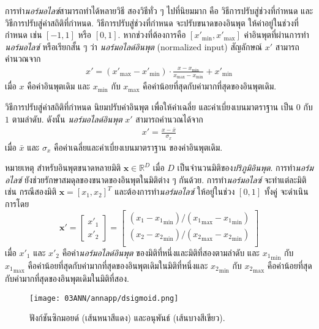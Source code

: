 การทำ\textit{นอร์มอไลซ์}สามารถทำได้หลายวิธี 
สองวิธีทั่ว ๆ ไปที่นิยมมาก คือ วิธีการปรับสู่ช่วงที่กำหนด และวิธีการปรับสู่ค่าสถิติที่กำหนด.
วิธีการปรับสู่ช่วงที่กำหนด จะปรับขนาดของอินพุต
ให้ค่าอยู่ในช่วงที่กำหนด เช่น $[-1,1]$ หรือ $[0,1]$.
หากช่วงที่ต้องการคือ
$[x'_{\min}, x'_{\max}]$ 
ค่าอินพุตที่ผ่านการทำ\textit{นอร์มอไลซ์}
หรือเรียกสั้น ๆ ว่า \textit{นอร์มอไลด์อินพุต} (normalized input) สัญลักษณ์ $x'$ สามารถคำนวณจาก
\begin{align}
x' = (x'_{\max} - x'_{\min}) \cdot \frac{x - x_{\min}}{x_{\max} - x_{\min}} + x'_{\min}
\label{eq: ann normalization [0,1]}
\end{align}
เมื่อ $x$ คือค่าอินพุตเดิม 
และ
$x_{\min}$ กับ $x_{\max}$ คือค่าน้อยที่สุดกับค่ามากที่สุดของอินพุตเดิม.

วิธีการปรับสู่ค่าสถิติที่กำหนด
นิยมปรับค่าอินพุต
เพื่อให้ค่าเฉลี่ย
และค่าเบี่ยงเบนมาตราฐาน เป็น $0$ กับ $1$ ตามลำดับ.
ดังนั้น
\textit{นอร์มอไลด์อินพุต} $x'$ สามารถคำนวณได้จาก
\begin{align}
x' = \frac{x - \bar{x}}{\sigma_x}
\label{eq: ann normalization stat}
\end{align}
เมื่อ $\bar{x}$ และ $\sigma_x$ คือค่าเฉลี่ยและค่าเบี่ยงเบนมาตราฐาน ของค่าอินพุตเดิม.

หมายเหตุ
สำหรับอินพุตขนาดหลายมิติ $\bm{x} \in \mathbb{R}^D$ เมื่อ $D$ เป็นจำนวนมิติของ\textit{ปริภูมิอินพุต}.
การทำ\textit{นอร์มอไลซ์} 
ยังช่วยรักษาสมดุลของขนาดของอินพุตในมิติต่าง ๆ กันด้วย.
การทำ\textit{นอร์มอไลซ์}
จะทำแต่ละมิติ 
เช่น กรณีสองมิติ $\bm{x} = [x_1, x_2]^T$ และต้องการทำ\textit{นอร์มอไลซ์}
ให้อยู่ในช่วง $[0,1]$ ทั้งคู่
จะดำเนินการโดย 
\[
\bm{x}' = \begin{bmatrix}
x'_1 \\
x'_2
\end{bmatrix}
= \begin{bmatrix}
(x_1 - {x_1}_{\min})/({x_1}_{\max} - {x_1}_{\min}) \\
(x_2 - {x_2}_{\min})/({x_2}_{\max} - {x_2}_{\min}) \\
\end{bmatrix}
\]
เมื่อ 
$x'_1$ และ $x'_2$ คือค่า\textit{นอร์มอไลด์อินพุต}
ของมิติที่หนึ่งและมิติที่สองตามลำดับ
และ
${x_1}_{\min}$ กับ ${x_1}_{\max}$ คือค่าน้อยที่สุดกับค่ามากที่สุดของอินพุตเดิมในมิติที่หนึ่งและ ${x_2}_{\min}$ กับ ${x_2}_{\max}$ คือค่าน้อยที่สุดกับค่ามากที่สุดของอินพุตเดิมในมิติที่สอง.




%
\begin{figure}
	\begin{center}
		\texttt{[image: 03ANN/annapp/dsigmoid.png]}
	\end{center}
	\caption[ฟังก์ชันซิกมอยด์]{ฟังก์ชันซิกมอยด์ (เส้นหนาสีแดง) และอนุพันธ์ (เส้นบางสีเขียว).}
	\label{fig: d sigmoid}
\end{figure}
%

